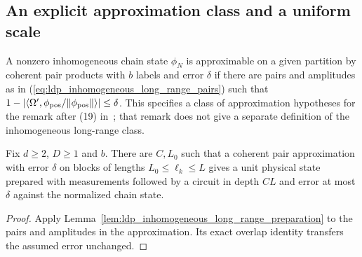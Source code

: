 \subsection{An explicit approximation class and a uniform scale}

\begin{definition}
    \label{def:ldp_coherent_pair_approximable}
    \leanok
    A nonzero inhomogeneous chain state $\phi_N$ is approximable on a given
    partition by coherent pair products with $b$ labels and error $\delta$ if
    there are pairs and amplitudes as in
    (\ref{eq:ldp_inhomogeneous_long_range_pairs}) such that
    $1-|\langle\Omega',\phi_{\rm pos}/\|\phi_{\rm pos}\|\rangle|\le\delta$.
    This specifies a class of approximation hypotheses for the remark
    after (19) in~\cite{Malz2024Preparation}; that remark does not give a
    separate definition of the inhomogeneous long-range class.
\end{definition}

\begin{lemma}
    \label{lem:ldp_coherent_pair_approximation_preparation}
    \leanok
    Fix $d\ge2$, $D\ge1$ and $b$. There are $C,L_0$ such that a coherent
    pair approximation with error $\delta$ on blocks of lengths
    $L_0\le\ell_k\le L$ gives a unit physical state prepared with measurements
    followed by a circuit in depth $CL$ and error at most $\delta$ against
    the normalized chain state.
\end{lemma}
\begin{proof}\leanok
    Apply Lemma~\ref{lem:ldp_inhomogeneous_long_range_preparation} to the pairs
    and amplitudes in the approximation. Its exact overlap identity transfers
    the assumed error unchanged.
\end{proof}

